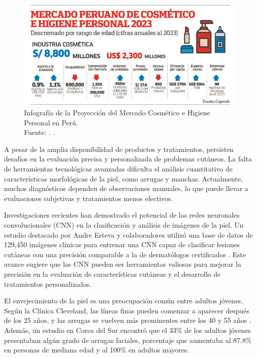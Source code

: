 \begin{figure}[!ht]
	\begin{center}
		\includegraphics[width=1\textwidth]{1/figures/careperu.jpg}
		\caption[Infografía de la Proyección del Mercado Cosmético e Higiene Personal en Perú]{Infografía de la Proyección del Mercado Cosmético e Higiene Personal en Perú.\\
			Fuente: \cite{elperuano2025belleza}. .}
		\label{1:fig4}
	\end{center}
\end{figure}

A pesar de la amplia disponibilidad de productos y tratamientos, persisten desafíos en la evaluación precisa y personalizada de problemas cutáneos. La falta de herramientas tecnológicas avanzadas dificulta el análisis cuantitativo de características morfológicas de la piel, como arrugas y manchas. Actualmente, muchos diagnósticos dependen de observaciones manuales, lo que puede llevar a evaluaciones subjetivas y tratamientos menos efectivos. \parencite{esteva2017}

Investigaciones recientes han demostrado el potencial de las redes neuronales convolucionales (CNN) en la clasificación y análisis de imágenes de la piel. Un estudio destacado por Andre Esteva y colaboradores utilizó una base de datos de 129,450 imágenes clínicas para entrenar una CNN capaz de clasificar lesiones cutáneas con una precisión comparable a la de dermatólogos certificados . Este avance sugiere que las CNN pueden ser herramientas valiosas para mejorar la precisión en la evaluación de características cutáneas y el desarrollo de tratamientos personalizados. \parencite{clevelandclinic2023}

El envejecimiento de la piel es una preocupación común entre adultos jóvenes. Según la Clínica Cleveland, las líneas finas pueden comenzar a aparecer después de los 25 años, y las arrugas se vuelven más prominentes entre los 40 y 55 años . Además, un estudio en Corea del Sur encontró que el 33\% de los adultos jóvenes presentaban algún grado de arrugas faciales, porcentaje que aumentaba al 87.8\% en personas de mediana edad y al 100\% en adultos mayores. \parencite{lee2008}

